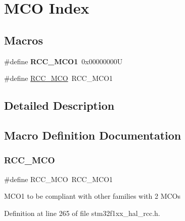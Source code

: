 \hypertarget{group___r_c_c___m_c_o___index}{}\section{M\+CO Index}
\label{group___r_c_c___m_c_o___index}
\subsection*{Macros}
\begin{DoxyCompactItemize}
\item 
\mbox{\label{group___r_c_c___m_c_o___index_ga152dd1ae9455e528526c4e23a817937b}} 
\#define {\bfseries R\+C\+C\+\_\+\+M\+C\+O1}~0x00000000U
\item 
\#define \hyperlink{group___r_c_c___m_c_o___index_gad9bc2abe13f0d3e62a5f9aa381927eb3}{R\+C\+C\+\_\+\+M\+CO}~R\+C\+C\+\_\+\+M\+C\+O1
\end{DoxyCompactItemize}


\subsection{Detailed Description}


\subsection{Macro Definition Documentation}
\mbox{\label{group___r_c_c___m_c_o___index_gad9bc2abe13f0d3e62a5f9aa381927eb3}} 
\subsubsection{\texorpdfstring{R\+C\+C\+\_\+\+M\+CO}{RCC\_MCO}}
{\footnotesize\ttfamily \#define R\+C\+C\+\_\+\+M\+CO~R\+C\+C\+\_\+\+M\+C\+O1}

M\+C\+O1 to be compliant with other families with 2 M\+C\+Os 

Definition at line 265 of file stm32f1xx\+\_\+hal\+\_\+rcc.\+h.

